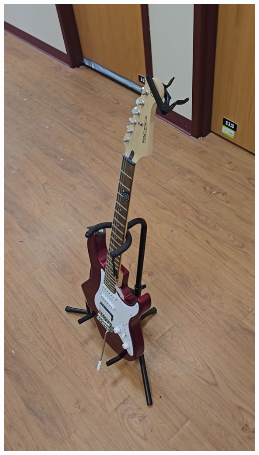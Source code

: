 \documentclass{article}
\begin{document}
\begin{center}
    \includegraphics[scale=0.02]{images/guitar1.jpg}

\end{center}
\end{document}
